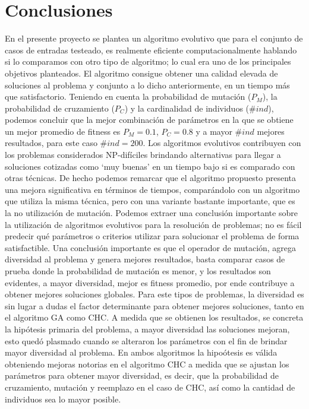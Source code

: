 \documentclass[journal]{IEEEtran}
\begin{document}
\section{Conclusiones}
En el presente proyecto se plantea un algoritmo evolutivo que para el conjunto de casos de entradas testeado, es realmente eficiente computacionalmente hablando si lo comparamos con otro tipo de algoritmo; lo cual era uno de los principales objetivos planteados. El algoritmo consigue obtener una calidad elevada de soluciones al problema y conjunto a lo dicho anteriormente, en un tiempo más que satisfactorio.
Teniendo en cuenta la probabilidad de mutación ($P_{M}$), la probabilidad de cruzamiento ($P_{C}$) y la cardinalidad de individuos ($\#ind$), podemos concluir que la mejor combinación de parámetros en la que se obtiene un mejor promedio de fitness es $P_{M}=0.1$, $P_{C}=0.8$ y a mayor $\#ind$ mejores resultados, para este caso $\#ind=200$.
Los algoritmos evolutivos contribuyen con los problemas considerados NP-difíciles brindando alternativas para llegar a soluciones cotizadas como ‘muy buenas’ en un tiempo bajo si es comparado con otras técnicas. De hecho podemos remarcar que el algoritmo propuesto presenta una mejora significativa en términos de tiempos, comparándolo con un algoritmo que utiliza la misma técnica, pero con una variante bastante importante, que es la no utilización de mutación. 
Podemos extraer una conclusión importante sobre la utilización de algoritmos evolutivos para la resolución de problemas; no es fácil predecir qué parámetros o criterios utilizar para solucionar el problema de forma satisfactible. 
Una conclusión importante es que el operador de mutación, agrega diversidad al problema y genera mejores resultados, basta comparar casos de prueba donde la probabilidad de mutación es menor, y los resultados son evidentes, a mayor diversidad, mejor es fitness promedio, por ende contribuye a obtener mejores soluciones globales. Para este tipos de problemas, la diversidad es sin lugar a dudas el factor determinante para obtener mejores soluciones, tanto en el algoritmo GA como CHC.
A medida que se obtienen los resultados, se concreta la hipótesis primaria del problema, a mayor diversidad las soluciones mejoran, esto quedó plasmado cuando se alteraron los parámetros con el fin de brindar mayor diversidad al problema. En ambos algoritmos la hipoótesis es válida obteniendo mejoras notorias en el algoritmo CHC a medida que se ajustan los parámetros para obtener mayor diversidad, es decir, que la probabilidad de cruzamiento, mutación y reemplazo en el caso de CHC, así como la cantidad de individuos sea lo mayor posible.
\end{document}
